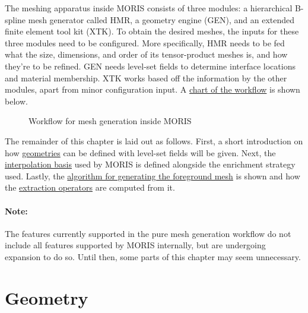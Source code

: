 The meshing apparatus inside MORIS consists of three modules: a hierarchical B-spline mesh generator called HMR, a geometry engine (GEN), and an extended finite element tool kit (XTK). To obtain the desired meshes, the inputs for these three modules need to be configured. More specifically, HMR needs to be fed what the size, dimensions, and order of its tensor-product meshes is, and how they're to be refined. GEN needs level-set fields to determine interface locations and material membership. XTK works based off the information by the other modules, apart from minor configuration input. A \hyperref[fig:workflow]{chart of the workflow} is shown below.

\begin{figure}[h]
    \vspace{0.5cm}
    \begin{center}
    
    \caption{Workflow for mesh generation inside MORIS} 
    \label{fig:workflow}
    \end{center}
\end{figure}

The remainder of this chapter is laid out as follows. First, a short introduction on how \hyperref[sec:overview_geometry]{geometries} can be defined with level-set fields will be given. Next, the \hyperref[sec:overview_background]{interpolation basis} used by MORIS is defined alongside the enrichment strategy used. Lastly, the \hyperlink{decomposition}{algorithm for generating the foreground mesh} is shown and how the \hyperref[sec:overview_extraction]{extraction operators} are computed from it.

\paragraph{Note:} The features currently supported in the pure mesh generation workflow do not include all features supported by MORIS internally, but are undergoing expansion to do so. Until then, some parts of this chapter may seem unnecessary. 


\section{Geometry}
\label{sec:overview_geometry}

